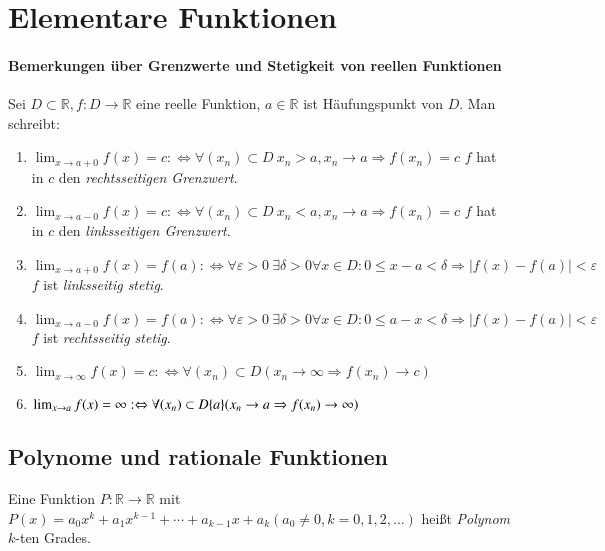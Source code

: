 \documentclass[ngerman,titlepage,twoside, parskip=half*]{scrreprt}
\newcommand*{\R}{\mathbb{R}}
\newcommand*{\perdef}{:\Leftrightarrow}
\theoremstyle{plain}
\theoremstyle{definition}
\theoremstyle{remark}
\begin{document}
\section{Elementare Funktionen}
\paragraph{Bemerkungen über Grenzwerte und Stetigkeit von reellen Funktionen}

Sei $D\subset \R , f\colon D\rightarrow \R$ eine reelle Funktion, $a\in\R$ ist Häufungspunkt von $D$. Man schreibt:
\begin{enumerate}[(1)]
  \item $\lim_{x\rightarrow a+0}f(x)=c\perdef \forall (x_n)\subset D\ x_n>a,x_n\rightarrow a\Rightarrow f(x_n)=c$ $f$ hat in $c$
    den \emph{rechtsseitigen Grenzwert}.
  \item $\lim_{x\rightarrow a-0}f(x)=c\perdef \forall (x_n)\subset D\ x_n<a,x_n\rightarrow a\Rightarrow f(x_n)=c$ $f$ hat in $c$
    den \emph{linksseitigen Grenzwert}.
  \item $\lim_{x\rightarrow a+0}f(x)=f(a)\perdef \forall \varepsilon >0\ \exists \delta >0 \forall x \in D\colon 0\leq x-a<\delta
    \Rightarrow |f(x)-f(a)|<\varepsilon$ $f$ ist \emph{linksseitig stetig}.
  \item $\lim_{x\rightarrow a-0}f(x)=f(a)\perdef \forall \varepsilon >0\ \exists \delta >0 \forall x \in D\colon 0\leq a-x<\delta
    \Rightarrow |f(x)-f(a)|<\varepsilon$ $f$ ist \emph{rechtsseitig stetig}.
  \item $\lim_{x\rightarrow\infty} f(x)=c\perdef \forall (x_n)\subset D (x_n \rightarrow \infty \Rightarrow f(x_n)\rightarrow c)$
  \item $\lim_{x\rightarrow a} f(x)=\infty\perdef \forall (x_n)\subset D\\\{a\} (x_n \rightarrow a \Rightarrow f(x_n)\rightarrow \infty)$
\end{enumerate}

\subsection{Polynome und rationale Funktionen}

Eine Funktion $P\colon\R\rightarrow \R$ mit $P(x)=a_0x^k+a_1x^{k-1}+\cdots + a_{k-1}x+a_k (a_0\neq 0, k=0,1,2,\ldots)$ heißt
\emph{Polynom} $k$-ten Grades.
\end{document}
